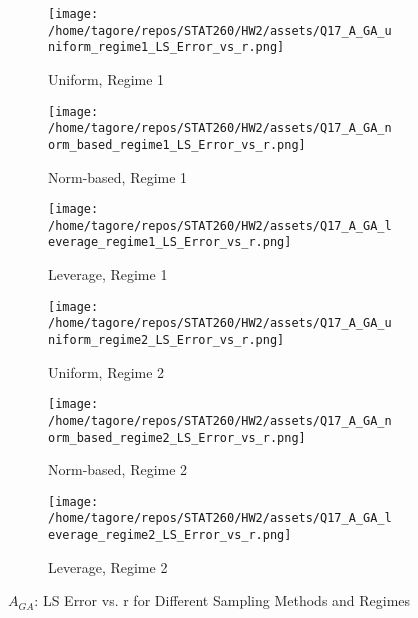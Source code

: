 \documentclass{article}
\begin{document}
\begin{figure}[H]
    \centering
    \begin{subfigure}[b]{0.32\textwidth}
        \centering
        \texttt{[image: /home/tagore/repos/STAT260/HW2/assets/Q17\_A\_GA\_uniform\_regime1\_LS\_Error\_vs\_r.png]}
        \caption{Uniform, Regime 1}
        \label{fig:GA_uniform_regime1}
    \end{subfigure}
    \begin{subfigure}[b]{0.32\textwidth}
        \centering
        \texttt{[image: /home/tagore/repos/STAT260/HW2/assets/Q17\_A\_GA\_norm\_based\_regime1\_LS\_Error\_vs\_r.png]}
        \caption{Norm-based, Regime 1}
        \label{fig:GA_norm_based_regime1}
    \end{subfigure}
    \begin{subfigure}[b]{0.32\textwidth}
        \centering
        \texttt{[image: /home/tagore/repos/STAT260/HW2/assets/Q17\_A\_GA\_leverage\_regime1\_LS\_Error\_vs\_r.png]}
        \caption{Leverage, Regime 1}
        \label{fig:GA_leverage_regime1}
    \end{subfigure}
    
    \vspace{0.5cm}
    
    \begin{subfigure}[b]{0.32\textwidth}
        \centering
        \texttt{[image: /home/tagore/repos/STAT260/HW2/assets/Q17\_A\_GA\_uniform\_regime2\_LS\_Error\_vs\_r.png]}
        \caption{Uniform, Regime 2}
        \label{fig:GA_uniform_regime2}
    \end{subfigure}
    \begin{subfigure}[b]{0.32\textwidth}
        \centering
        \texttt{[image: /home/tagore/repos/STAT260/HW2/assets/Q17\_A\_GA\_norm\_based\_regime2\_LS\_Error\_vs\_r.png]}
        \caption{Norm-based, Regime 2}
        \label{fig:GA_norm_based_regime2}
    \end{subfigure}
    \begin{subfigure}[b]{0.32\textwidth}
        \centering
        \texttt{[image: /home/tagore/repos/STAT260/HW2/assets/Q17\_A\_GA\_leverage\_regime2\_LS\_Error\_vs\_r.png]}
        \caption{Leverage, Regime 2}
        \label{fig:GA_leverage_regime2}
    \end{subfigure}
    
    \caption{\(A_{GA}\): LS Error vs. r for Different Sampling Methods and Regimes}
    \label{fig:GA_comparison}
\end{figure}
\end{document}
